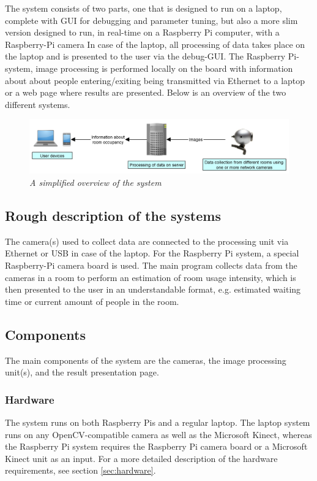 The system consists of two parts, one that is designed to run on a laptop, complete with GUI for debugging and parameter tuning, but also a more slim version designed to run, in real-time on a Raspberry Pi computer, with a Raspberry-Pi camera In case of the laptop, all processing of data takes place on the laptop and is presented to the user via the debug-GUI. The Raspberry Pi-system, image processing is performed locally on the board with information about about people entering/exiting being transmitted via Ethernet to a laptop or a web page where results are presented. Below is an overview of the two different systems.

\vspace{0.5cm}
\begin{figure}[htb]
	\centering
	\includegraphics[width=170mm]{images/system_overview.png}
	\caption[System overview]{\textit{A simplified overview of the system}}
	\label{fig:block_overview2_fig}  %
\end{figure}

\subsection{Rough description of the systems}
The camera(s) used to collect data are connected to the processing unit via Ethernet or USB in case of the laptop. For the Raspberry Pi system, a special Raspberry-Pi camera board is used. The main program collects data from the cameras in a room to perform an estimation of room usage intensity, which is then presented to the user in an understandable format, e.g. estimated waiting time or current amount of people in the room.

\subsection{Components}
The main components of the system are the cameras, the image processing unit(s), and the result presentation page.

\subsubsection{Hardware}
The system runs on both Raspberry Pis and a regular laptop. The laptop system runs on any OpenCV-compatible camera as well as the Microsoft Kinect, whereas the Raspberry Pi system requires the Raspberry Pi camera board or a Microsoft Kinect unit as an input. For a more detailed description of the hardware requirements, see section \ref{sec:hardware}.

